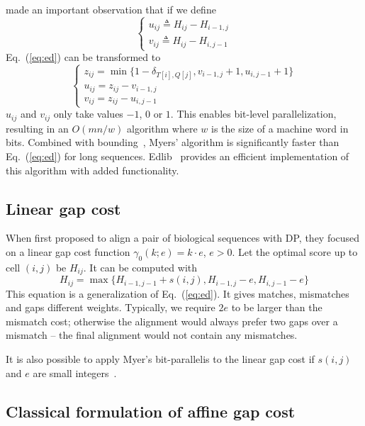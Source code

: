 \documentclass{bioinfo}
\begin{document}
\begin{methods}
\citet{Myers:1999aa} made an important observation that if we define
\[\left\{\begin{array}{l}
u_{ij}\triangleq H_{ij}-H_{i-1,j}\\
v_{ij}\triangleq H_{ij}-H_{i,j-1}
\end{array}\right.\]
Eq.~(\ref{eq:ed}) can be transformed to
\begin{equation}
\left\{\begin{array}{l}
z_{ij}=\min\{1-\delta_{T[i],Q[j]},v_{i-1,j}+1,u_{i,j-1}+1\}\\
u_{ij}=z_{ij}-v_{i-1,j}\\
v_{ij}=z_{ij}-u_{i,j-1}
\end{array}\right.
\end{equation}
$u_{ij}$ and $v_{ij}$ only take values $-1$, $0$ or $1$. This enables bit-level
parallelization, resulting in an $O(mn/w)$ algorithm where $w$ is the size of a
machine word in bits. Combined with bounding~\citep{Ukkonen:1985aa}, Myers'
algorithm is significantly faster than Eq.~(\ref{eq:ed}) for long sequences.
Edlib~\citep{Sosic:2017aa} provides an efficient implementation of this
algorithm with added functionality.

\subsection{Linear gap cost}

When \citet{Needleman:1970aa} first proposed to align a pair of biological
sequences with DP, they focused on a linear gap cost function
$\gamma_0(k;e)=k\cdot e$, $e>0$. Let the optimal score up to cell $(i,j)$ be
$H_{ij}$. It can be computed with
\begin{equation}\label{eq:linear}
H_{ij}=\max\{H_{i-1,j-1}+s(i,j), H_{i-1,j}-e, H_{i,j-1}-e\}
\end{equation}
This equation is a generalization of Eq.~(\ref{eq:ed}). It gives matches,
mismatches and gaps different weights.  Typically, we require $2e$ to be larger
than the mismatch cost; otherwise the alignment would always prefer two gaps
over a mismatch -- the final alignment would not contain any mismatches.

It is also possible to apply Myer's bit-parallelis to the linear gap cost
if $s(i,j)$ and $e$ are small integers~\citep{Loving:2014aa}.

\subsection{Classical formulation of affine gap cost}


\end{methods}
\end{document}
